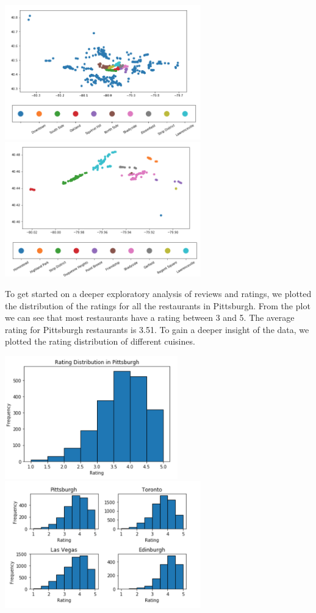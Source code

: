 \documentclass{neu_handout}
\begin{document}
\begin{center}
\includegraphics[width=85mm,scale=0.5]{pitts_hoods_most_restaurants}
\includegraphics[width=85mm,scale=0.5]{top_10_most_popular_neighborhoods}
\end{center}

To get started on a deeper exploratory analysis of reviews and ratings, we plotted the distribution of the ratings for all the restaurants in Pittsburgh. From the plot we can see that most restaurants have a rating between 3 and 5. The average rating for Pittsburgh restaurants is 3.51. To gain a deeper insight of the data, we plotted the rating distribution of different cuisines. 

\begin{center}
	\includegraphics[width=75mm,scale=0.3]{rating_distribution_in_Pittsburgh}
	\includegraphics[width=85mm,scale=0.3]{rating_distribution_vs_countries}
\end{center}
\end{document}
